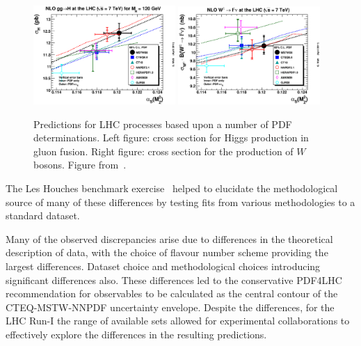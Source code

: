 \begin{figure}[ht]
\centering
\includegraphics[width=0.48\textwidth]{3-PDFdet/figs/ggH120GeVLHC7TeVnlo68cl.eps}
\includegraphics[width=0.48\textwidth]{3-PDFdet/figs/wpmLHC7TeVnlo68cl.eps}
\caption[Predictions for example LHC processes based upon a number of PDF determinations]{Predictions for LHC processes based upon a number of PDF determinations. Left figure: cross section for Higgs production in gluon fusion. Right figure: cross section for the production of $W$ bosons. Figure from~\cite{Watt:2011kp}.}
\label{fig:standardcandleerror}
\end{figure}
The Les Houches benchmark exercise~\cite{Dittmar:2009ii} helped to elucidate the methodological source of many of these differences by testing fits from various methodologies to a standard dataset.

Many of the observed discrepancies arise due to differences in the theoretical description of data, with the choice of flavour number scheme providing the largest differences. Dataset choice and methodological choices introducing significant differences also. These differences led to the conservative PDF4LHC recommendation for observables to be calculated as the central contour of the CTEQ-MSTW-NNPDF uncertainty envelope. Despite the differences, for the LHC Run-I the range of available sets allowed for experimental collaborations to effectively explore the differences in the resulting predictions.

